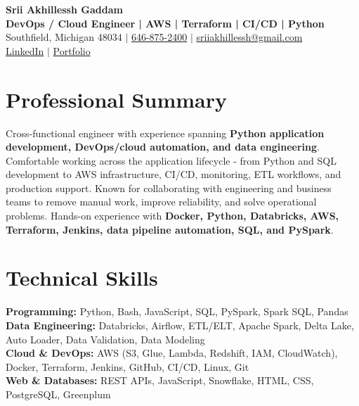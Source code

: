 \documentclass[letterpaper,10pt]{article}
\begin{document}
\fontsize{9.35pt}{10.45pt}\selectfont

\begin{center}
    {\LARGE \textbf{Srii Akhillessh Gaddam}} \\[-1pt]
    \textbf{DevOps / Cloud Engineer | AWS | Terraform | CI/CD | Python} \\[2pt]
    Southfield, Michigan 48034 $|$
    \href{tel:6468752400}{646-875-2400} $|$
    \href{mailto:sriiakhillessh@gmail.com}{sriiakhillessh@gmail.com} \\[1pt]
    \href{https://www.linkedin.com/in/srii-akhiilessh-gaddam-b48668191/}{LinkedIn} $|$
    \href{https://sriiakhillesshg.github.io/portfolio/}{Portfolio}
\end{center}
\vspace{-8pt}

\section{Professional Summary}
\small{Cross-functional engineer with experience spanning \textbf{Python application development, DevOps/cloud automation, and data engineering}. Comfortable working across the application lifecycle - from Python and SQL development to AWS infrastructure, CI/CD, monitoring, ETL workflows, and production support. Known for collaborating with engineering and business teams to remove manual work, improve reliability, and solve operational problems. Hands-on experience with \textbf{Docker, Python, Databricks, AWS, Terraform, Jenkins, data pipeline automation, SQL, and PySpark}.}

\section{Technical Skills}
\small{
\textbf{Programming:} Python, Bash, JavaScript, SQL, PySpark, Spark SQL, Pandas \\
\textbf{Data Engineering:} Databricks, Airflow, ETL/ELT, Apache Spark, Delta Lake, Auto Loader, Data Validation, Data Modeling \\
\textbf{Cloud \& DevOps:} AWS (S3, Glue, Lambda, Redshift, IAM, CloudWatch), Docker, Terraform, Jenkins, GitHub, CI/CD, Linux, Git \\
\textbf{Web \& Databases:} REST APIs, JavaScript, Snowflake, HTML, CSS, PostgreSQL, Greenplum
}
\end{document}
